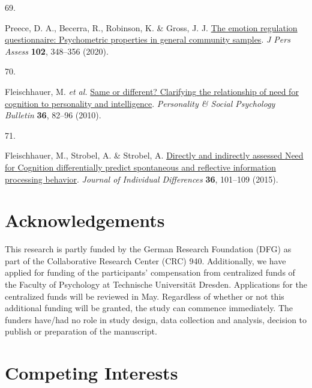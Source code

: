 \documentclass[
  man,floatsintext]{apa6}
\newlength{\cslhangindent}
\newlength{\csllabelwidth}
\newlength{\cslentryspacingunit} %
\newenvironment{CSLReferences}[2] %
 {%
  \setlength{\parindent}{0pt}
  \ifodd #1
  \let\oldpar\par
  \def\par{\hangindent=\cslhangindent\oldpar}
  \fi
  \setlength{\parskip}{#2\cslentryspacingunit}
 }%
 {}
\newcommand{\CSLLeftMargin}[1]{\parbox[t]{\csllabelwidth}{#1}}
\newcommand{\CSLRightInline}[1]{\parbox[t]{\linewidth - \csllabelwidth}{#1}\break}
\begin{document}
\begin{CSLReferences}{0}{0}
\leavevmode{}%
\CSLLeftMargin{69. }%
\CSLRightInline{Preece, D. A., Becerra, R., Robinson, K. \& Gross, J. J. \href{https://doi.org/10.1080/00223891.2018.1564319}{The emotion regulation questionnaire: Psychometric properties in general community samples}. \emph{J Pers Assess} \textbf{102}, 348--356 (2020).}

\leavevmode{}%
\CSLLeftMargin{70. }%
\CSLRightInline{Fleischhauer, M. \emph{et al.} \href{https://doi.org/10.1177/0146167209351886}{Same or different? {Clarifying} the relationship of need for cognition to personality and intelligence}. \emph{Personality \& Social Psychology Bulletin} \textbf{36}, 82--96 (2010).}

\leavevmode{}%
\CSLLeftMargin{71. }%
\CSLRightInline{Fleischhauer, M., Strobel, A. \& Strobel, A. \href{https://doi.org/10.1027/1614-0001/a000161}{Directly and indirectly assessed {N}eed for {C}ognition differentially predict spontaneous and reflective information processing behavior}. \emph{Journal of Individual Differences} \textbf{36}, 101--109 (2015).}

\end{CSLReferences}

\endgroup

\newpage

\hypertarget{acknowledgements}{%
\section{Acknowledgements}\label{acknowledgements}}

This research is partly funded by the German Research Foundation (DFG) as part of the Collaborative Research Center (CRC) 940.
Additionally, we have applied for funding of the participants' compensation from centralized funds of the Faculty of Psychology at Technische Universität Dresden.
Applications for the centralized funds will be reviewed in May.
Regardless of whether or not this additional funding will be granted, the study can commence immediately.
The funders have/had no role in study design, data collection and analysis, decision to publish or preparation of the manuscript.

\hypertarget{competing-interests}{%
\section{Competing Interests}\label{competing-interests}}
\end{document}
